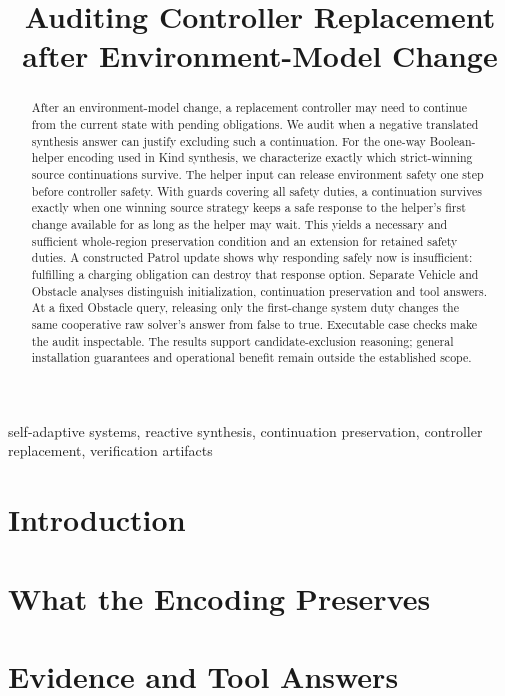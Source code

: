 \documentclass[conference,10pt]{IEEEtran}
\title{Auditing Controller Replacement after Environment-Model Change}
\author{\IEEEauthorblockN{Anonymous authors}}
\begin{document}
\raggedbottom\maketitle
\begin{abstract}
After an environment-model change, a replacement controller may need to
continue from the current state with pending obligations. We audit when a
negative translated synthesis answer can justify excluding such a continuation.
For the one-way Boolean-helper encoding used in Kind synthesis, we characterize
exactly which strict-winning source continuations survive. The helper input can
release environment safety one step before controller safety. With guards covering all safety duties, a continuation survives exactly when
one winning source strategy keeps a safe response to the helper's first
change available for as long as the helper may wait.
This yields a necessary and sufficient whole-region preservation condition
and an extension for retained safety duties. A constructed Patrol update
shows why responding safely now is insufficient: fulfilling a charging
obligation can destroy that response option. Separate Vehicle and Obstacle
analyses distinguish initialization, continuation preservation and tool answers.
At a fixed Obstacle query, releasing only the first-change system duty changes
the same cooperative raw solver's answer from false to true. Executable case checks make the
audit inspectable. The results support candidate-exclusion reasoning;
general installation guarantees and operational benefit remain outside the established scope.
\end{abstract}
\begin{IEEEkeywords}
self-adaptive systems, reactive synthesis, continuation preservation,
controller replacement, verification artifacts
\end{IEEEkeywords}
\section{Introduction}\label{sec:intro}


\FloatBarrier
\section{What the Encoding Preserves}\label{sec:formal}



\FloatBarrier

\FloatBarrier
\section{Evidence and Tool Answers}\label{sec:evidence}




\FloatBarrier


\end{document}
